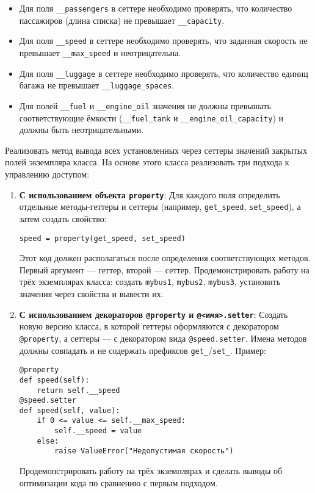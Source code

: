 \begin{enumerate}
\begin{itemize}
    \item Для поля \texttt{\_\_passengers} в сеттере необходимо проверять, что количество пассажиров (длина списка) не превышает \texttt{\_\_capacity}.  
    \item Для поля \texttt{\_\_speed} в сеттере необходимо проверять, что заданная скорость не превышает \texttt{\_\_max\_speed} и неотрицательна.  
    \item Для поля \texttt{\_\_luggage} в сеттере необходимо проверять, что количество единиц багажа не превышает \texttt{\_\_luggage\_spaces}.
    \item Для полей \texttt{\_\_fuel} и \texttt{\_\_engine\_oil} значения не должны превышать соответствующие ёмкости (\texttt{\_\_fuel\_tank} и \texttt{\_\_engine\_oil\_capacity}) и должны быть неотрицательными.
\end{itemize}
Реализовать метод вывода всех установленных через сеттеры значений закрытых полей экземпляра класса.
На основе этого класса реализовать три подхода к управлению доступом:
\begin{enumerate}
    \item \textbf{С использованием объекта \texttt{property}}:  
    Для каждого поля определить отдельные методы-геттеры и сеттеры (например, \texttt{get\_speed}, \texttt{set\_speed}), а затем создать свойство:  
    \begin{verbatim}
speed = property(get_speed, set_speed)
    \end{verbatim}  
    Этот код должен располагаться после определения соответствующих методов. Первый аргумент — геттер, второй — сеттер.  
    Продемонстрировать работу на трёх экземплярах класса: создать \texttt{mybus1}, \texttt{mybus2}, \texttt{mybus3}, установить значения через свойства и вывести их.
    \item \textbf{С использованием декораторов \texttt{@property} и \texttt{@<имя>.setter}}:  
    Создать новую версию класса, в которой геттеры оформляются с декоратором \texttt{@property}, а сеттеры — с декоратором вида \texttt{@speed.setter}. Имена методов должны совпадать и не содержать префиксов \texttt{get\_}/\texttt{set\_}.  
    Пример:  
    \begin{verbatim}
@property
def speed(self):
    return self.__speed
@speed.setter
def speed(self, value):
    if 0 <= value <= self.__max_speed:
        self.__speed = value
    else:
        raise ValueError("Недопустимая скорость")
    \end{verbatim}  
    Продемонстрировать работу на трёх экземплярах и сделать выводы об оптимизации кода по сравнению с первым подходом.

\end{enumerate}
\end{enumerate}
